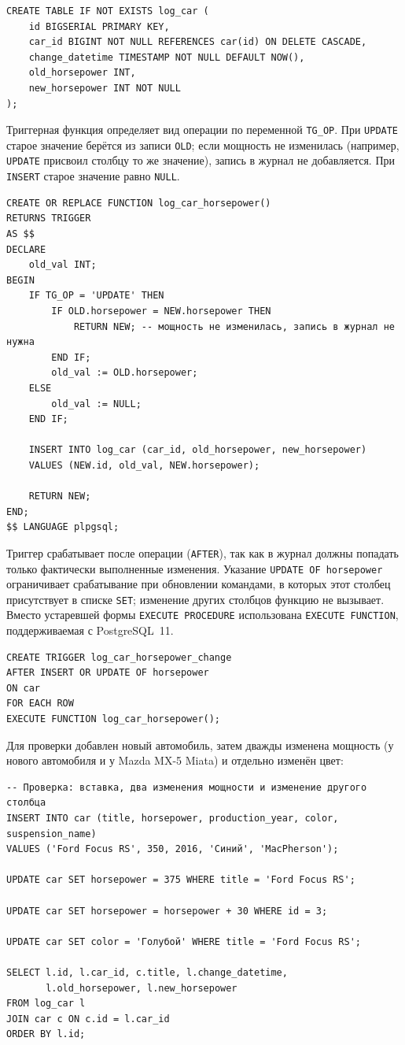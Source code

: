 \documentclass[oneside,a4paper,14pt]{extarticle}
\begin{document}
\begin{verbatim}
CREATE TABLE IF NOT EXISTS log_car (
    id BIGSERIAL PRIMARY KEY,
    car_id BIGINT NOT NULL REFERENCES car(id) ON DELETE CASCADE,
    change_datetime TIMESTAMP NOT NULL DEFAULT NOW(),
    old_horsepower INT,
    new_horsepower INT NOT NULL
);
\end{verbatim}

Триггерная функция определяет вид операции по переменной \texttt{TG\_OP}. При \texttt{UPDATE} старое значение берётся из записи \texttt{OLD}; если мощность не изменилась (например, \texttt{UPDATE} присвоил столбцу то же значение), запись в журнал не добавляется. При \texttt{INSERT} старое значение равно \texttt{NULL}.

\begin{verbatim}
CREATE OR REPLACE FUNCTION log_car_horsepower()
RETURNS TRIGGER
AS $$
DECLARE
    old_val INT;
BEGIN
    IF TG_OP = 'UPDATE' THEN
        IF OLD.horsepower = NEW.horsepower THEN
            RETURN NEW; -- мощность не изменилась, запись в журнал не нужна
        END IF;
        old_val := OLD.horsepower;
    ELSE
        old_val := NULL;
    END IF;

    INSERT INTO log_car (car_id, old_horsepower, new_horsepower)
    VALUES (NEW.id, old_val, NEW.horsepower);

    RETURN NEW;
END;
$$ LANGUAGE plpgsql;
\end{verbatim}

Триггер срабатывает после операции (\texttt{AFTER}), так как в журнал должны попадать только фактически выполненные изменения. Указание \texttt{UPDATE OF horsepower} ограничивает срабатывание при обновлении командами, в которых этот столбец присутствует в списке \texttt{SET}; изменение других столбцов функцию не вызывает. Вместо устаревшей формы \texttt{EXECUTE PROCEDURE} использована \texttt{EXECUTE FUNCTION}, поддерживаемая с PostgreSQL~11.

\begin{verbatim}
CREATE TRIGGER log_car_horsepower_change
AFTER INSERT OR UPDATE OF horsepower
ON car
FOR EACH ROW
EXECUTE FUNCTION log_car_horsepower();
\end{verbatim}

Для проверки добавлен новый автомобиль, затем дважды изменена мощность (у нового автомобиля и у Mazda MX-5 Miata) и отдельно изменён цвет:

\begin{verbatim}
-- Проверка: вставка, два изменения мощности и изменение другого столбца
INSERT INTO car (title, horsepower, production_year, color, suspension_name)
VALUES ('Ford Focus RS', 350, 2016, 'Синий', 'MacPherson');

UPDATE car SET horsepower = 375 WHERE title = 'Ford Focus RS';

UPDATE car SET horsepower = horsepower + 30 WHERE id = 3;

UPDATE car SET color = 'Голубой' WHERE title = 'Ford Focus RS';

SELECT l.id, l.car_id, c.title, l.change_datetime,
       l.old_horsepower, l.new_horsepower
FROM log_car l
JOIN car c ON c.id = l.car_id
ORDER BY l.id;
\end{verbatim}
\end{document}
